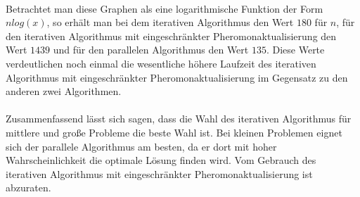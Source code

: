 \documentclass[doktyp=barbeit, sprache=german]{TUBAFarbeiten}
\begin{document}
\\Betrachtet man diese Graphen als eine logarithmische Funktion der Form $n log(x)$, so erhält man bei dem iterativen Algorithmus den Wert $180$ für $n$, für den iterativen Algorithmus mit eingeschränkter Pheromonaktualisierung den Wert $1439$ und für den parallelen Algorithmus den Wert $135$. Diese Werte verdeutlichen noch einmal die wesentliche höhere Laufzeit des iterativen Algorithmus mit eingeschränkter Pheromonaktualisierung im Gegensatz zu den anderen zwei Algorithmen.
\\\\Zusammenfassend lässt sich sagen, dass die Wahl des iterativen Algorithmus für mittlere und große Probleme die beste Wahl ist. Bei kleinen Problemen eignet sich der parallele Algorithmus am besten, da er dort mit hoher Wahrscheinlichkeit die optimale Lösung finden wird. Vom Gebrauch des iterativen Algorithmus mit eingeschränkter Pheromonaktualisierung ist abzuraten.
\end{document}

